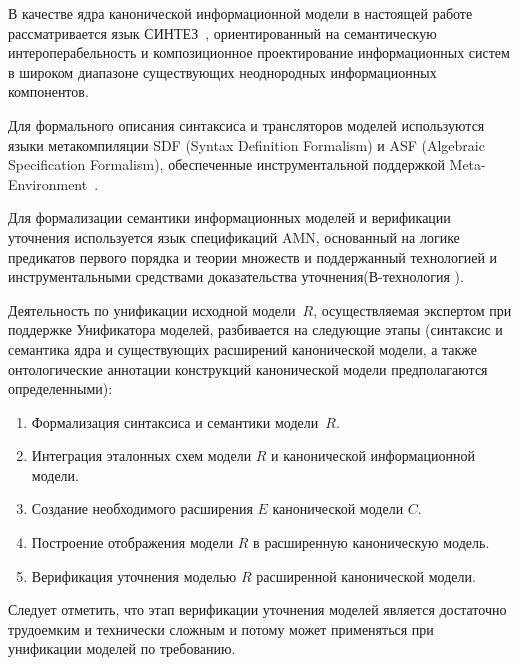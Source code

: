 \begin{multicols}{2}
В качестве ядра канонической информационной модели в настоящей работе рассматривается язык
СИНТЕЗ~\cite{Sy07}, ориентированный на семантическую интероперабельность
и композиционное проектирование информационных систем в широком
диапазоне существующих неоднородных информационных компонентов.

Для формального описания синтаксиса и трансляторов моделей
используются языки метакомпиляции
SDF (Syntax Definition Formalism) и ASF (Algebraic Specification Formalism),
обеспеченные инструментальной поддержкой Meta-Environment~\cite{meta01}.

Для формализации семантики информационных моделей и верификации
уточнения используется язык спецификаций
AMN, основанный на логике предикатов первого порядка и
теории множеств и поддержанный технологией и инструментальными средствами
доказательства уточнения\linebreak (В-технология \cite{Ab93}).

Деятельность по унификации исходной модели~$R$, осуществляемая
экспертом при поддержке Унификатора моделей,
разбивается на следующие этапы (синтаксис и семантика ядра и
су\-ще\-ст\-ву\-ющих расширений канонической модели, а также онтологические
аннотации конструкций канонической модели предполагаются определенными):
\begin{enumerate}
\item Формализация синтаксиса и семантики модели~$R$.
\item Интеграция эталонных схем модели $R$ и канонической информационной модели.
\item Создание необходимого расширения $E$ канонической модели $C$.
\item Построение отображения модели $R$ в расширенную каноническую модель.
\item Верификация уточнения моделью $R$ расширенной канонической модели.
\end{enumerate}

Следует отметить, что этап верификации уточнения моделей является
достаточно трудоемким и технически сложным и потому может
применяться при унификации моделей по требованию.


\end{multicols}
